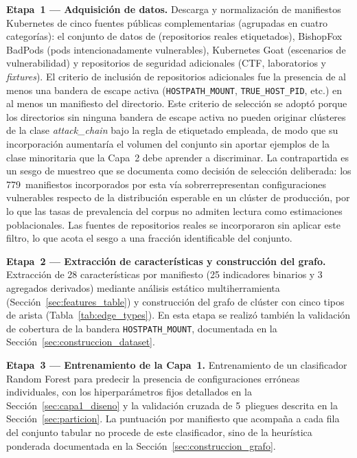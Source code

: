 \textbf{Etapa~1 — Adquisición de datos.} Descarga y normalización de manifiestos
Kubernetes de cinco fuentes públicas complementarias (agrupadas en
cuatro categorías): el conjunto de datos
de \citet{Rahman2022} (repositorios reales etiquetados), BishopFox
BadPods \citep{BishopFox2021} (pods intencionadamente vulnerables), Kubernetes
Goat \citep{KubernetesGoat} (escenarios de vulnerabilidad) y repositorios de
seguridad adicionales (CTF, laboratorios y \textit{fixtures}). El criterio de
inclusión de repositorios adicionales fue la presencia de al menos una bandera de escape
activa (\texttt{HOSTPATH\_MOUNT}, \texttt{TRUE\_HOST\_PID}, etc.) en al menos un
manifiesto del directorio. Este criterio de selección se adoptó porque los
directorios sin ninguna bandera de escape activa no pueden originar clústeres de la
clase \textit{attack\_chain} bajo la regla de etiquetado empleada, de modo que su
incorporación aumentaría el volumen del conjunto sin aportar ejemplos de la clase
minoritaria que la Capa~2 debe aprender a discriminar. La contrapartida es un sesgo
de muestreo que se documenta como decisión de selección deliberada: los
779~manifiestos incorporados por esta vía sobrerrepresentan configuraciones
vulnerables respecto de la distribución esperable en un clúster de producción, por
lo que las tasas de prevalencia del corpus no admiten lectura como estimaciones
poblacionales. Las fuentes de repositorios reales se incorporaron sin aplicar este
filtro, lo que acota el sesgo a una fracción identificable del conjunto.

\textbf{Etapa~2 — Extracción de características y construcción del grafo.} Extracción
de 28 características por manifiesto (25 indicadores binarios y 3 agregados
derivados) mediante análisis estático multiherramienta
(Sección~\ref{sec:features_table}) y construcción del grafo de
clúster con cinco tipos de arista (Tabla~\ref{tab:edge_types}). En esta etapa se
realizó también la validación de cobertura de la bandera \texttt{HOSTPATH\_MOUNT},
documentada en la Sección~\ref{sec:construccion_dataset}.

\textbf{Etapa~3 — Entrenamiento de la Capa~1.} Entrenamiento de un clasificador
Random Forest para predecir la presencia de configuraciones erróneas
individuales, con los hiperparámetros fijos detallados en la
Sección~\ref{sec:capa1_diseno} y la validación cruzada de 5~pliegues descrita en
la Sección~\ref{sec:particion}. La puntuación por manifiesto que acompaña a cada
fila del conjunto tabular no procede de este clasificador, sino de la heurística
ponderada documentada en la Sección~\ref{sec:construccion_grafo}.

